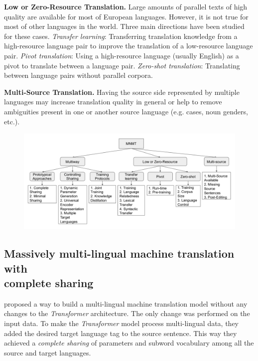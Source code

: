 \textbf{Low or Zero-Resource Translation.}
Large amounts of parallel texts of high quality are available for most of European
languages. However, it is not true for most of other languages in the world.
Three main directions have been studied for these cases.
\textit{Transfer learning}: Transferring translation knowledge from a high-resource language pair
to improve the translation of a low-resource language pair.
\textit{Pivot translation}: Using a high-resource language (usually English) as a pivot to translate
between a language pair.
\textit{Zero-shot translation}: Translating between language pairs without parallel corpora.

\textbf{Multi-Source Translation.} Having the source side represented by multiple languages
may increase translation quality in general or help to remove ambiguities present in one or another
source language (e.g. cases, noun genders, etc.).


\begin{figure}[h]
	\begin{minipage}{0.9\textwidth}
	\centering
	\includegraphics[width=1.0\columnwidth]{img/dabre_2019_mnmt_categorized.png}
	\end{minipage}\hfill
	\label{fig:mnmt_categorized}
\end{figure}


\subsection{Massively multi-lingual machine translation with \\complete sharing}
\label{section:multitarget_theory}

\citet{johnson-etal-2017-googles} proposed a way to build a multi-lingual
machine translation model without any changes to the \emph{Transformer} architecture.
The only change was performed on the input data.
To make the \emph{Transformer} model process multi-lingual data,
they added the desired target language tag to the source sentence.
This way they achieved a \emph{complete sharing} of parameters and subword vocabulary
among all the source and target languages.

